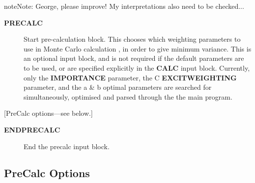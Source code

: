 \documentclass[openany,a4paper,10pt,english]{manual}
\begin{document}
\begin{notice}{note}{Note:}
George, please improve!  My interpretations also need to be checked...
\end{notice}
\begin{description}
\item[\textbf{PRECALC}] \leavevmode
Start pre-calculation block.  This chooses which weighting parameters
to use in Monte Carlo calculation , in order to give minimum variance.
This is an optional input block, and is not required if the default
parameters are to be used, or are specified explicitly in the \textbf{CALC}
input block.  Currently, only the \textbf{IMPORTANCE} parameter, the C
\textbf{EXCITWEIGHTING} parameter, and the a \& b optimal parameters are
searched for simultaneously, optimised and parsed through the the
main program.

\end{description}

{[}PreCalc options---see below.{]}
\begin{description}
\item[\textbf{ENDPRECALC}] \leavevmode
End the precalc input block.

\end{description}


\subsection{PreCalc Options}
\end{document}
